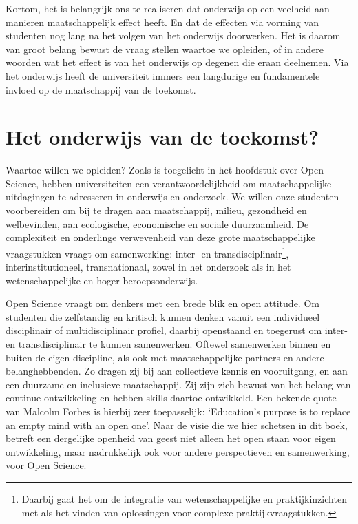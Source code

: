 \documentclass{jote-book}
\begin{document}
	Kortom, het is belangrijk ons te realiseren dat onderwijs op een veelheid aan manieren maatschappelijk effect heeft. En dat de effecten via vorming van studenten nog lang na het volgen van het onderwijs doorwerken. Het is daarom van groot belang bewust de vraag stellen waartoe we opleiden, of in andere woorden wat het effect is van het onderwijs op degenen die eraan deelnemen. Via het onderwijs heeft de universiteit immers een langdurige en fundamentele invloed op de maatschappij van de toekomst.



	\section{Het onderwijs van de toekomst?}



	Waartoe willen we opleiden? Zoals is toegelicht in het hoofdstuk over Open Science, hebben universiteiten een verantwoordelijkheid om maatschappelijke uitdagingen te adresseren in onderwijs en onderzoek. We willen onze studenten voorbereiden om bij te dragen aan maatschappij, milieu, gezondheid en welbevinden, aan ecologische, economische en sociale duurzaamheid. De complexiteit en onderlinge verwevenheid van deze grote maatschappelijke vraagstukken vraagt om samenwerking: inter- en transdisciplinair\footnote{Daarbij gaat het om de integratie van wetenschappelijke en praktijkinzichten met als het vinden van oplossingen voor complexe praktijkvraagstukken.}, interinstitutioneel, transnationaal, zowel in het onderzoek als in het wetenschappelijke en hoger beroepsonderwijs.



	Open Science vraagt om denkers met een brede blik en open attitude. Om studenten die zelfstandig en kritisch kunnen denken vanuit een individueel disciplinair of multidisciplinair profiel, daarbij openstaand en toegerust om inter- en transdisciplinair te kunnen samenwerken. Oftewel samenwerken binnen en buiten de eigen discipline, als ook met maatschappelijke partners en andere belanghebbenden. Zo dragen zij bij aan collectieve kennis en vooruitgang, en aan een duurzame en inclusieve maatschappij. Zij zijn zich bewust van het belang van continue ontwikkeling en hebben skills daartoe ontwikkeld. Een bekende quote van Malcolm Forbes is hierbij zeer toepasselijk: ‘Education's purpose is to replace an empty mind with an open one'. Naar de visie die we hier schetsen in dit boek, betreft een dergelijke openheid van geest niet alleen het open staan voor eigen ontwikkeling, maar nadrukkelijk ook voor andere perspectieven en samenwerking, voor Open Science.
\end{document}
